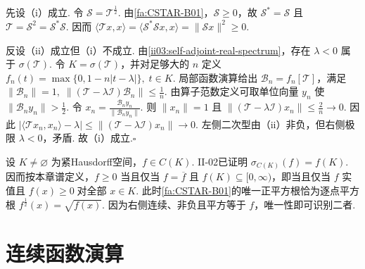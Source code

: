 \begin{FAProof}
先设（i）成立. 令 \(\displaystyle\mathcal S=\mathcal T^{\frac{1}{2}}\). 由\autoref{fa:CSTAR-B01}，\(\displaystyle\mathcal S\geqslant0\)，故 \(\displaystyle\mathcal S^*=\mathcal S\) 且 \(\displaystyle\mathcal T=\mathcal S^2=\mathcal S^*\mathcal S\). 因而
\(\displaystyle \langle\mathcal T x,x\rangle =\langle\mathcal S^*\mathcal Sx,x\rangle =\|\mathcal Sx\|^2 \geqslant0.\)

反设（ii）成立但（i）不成立. 由\autoref{ii03:self-adjoint-real-spectrum}，存在 \(\displaystyle\lambda<0\) 属于 \(\displaystyle\sigma(\mathcal T)\). 令 \(\displaystyle K=\sigma(\mathcal T)\)，并对足够大的 \(\displaystyle n\) 定义
\(\displaystyle f_n(t)=\max\{0,1-n|t-\lambda|\}, \; t\in K.\)
局部函数演算给出 \(\displaystyle\mathcal B_n=f_n[\mathcal T]\)，满足
\(\displaystyle \|\mathcal B_n\|=1, \; \|(\mathcal T-\lambda\mathcal I)\mathcal B_n\|\leqslant\frac1n.\)
由算子范数定义可取单位向量 \(\displaystyle y_n\) 使 \(\displaystyle\|\mathcal B_ny_n\|>\frac{1}{2}\). 令
\(\displaystyle x_n=\frac{\mathcal B_ny_n}{\|\mathcal B_ny_n\|}.\)
则 \(\displaystyle\|x_n\|=1\) 且
\(\displaystyle \|(\mathcal T-\lambda\mathcal I)x_n\| \leqslant\frac{2}{n} \longrightarrow0.\)
因此
\(\displaystyle \bigl|\langle\mathcal T x_n,x_n\rangle-\lambda\bigr| \leqslant\|(\mathcal T-\lambda\mathcal I)x_n\| \longrightarrow0.\)
左侧二次型由（ii）非负，但右侧极限 \(\displaystyle\lambda<0\)，矛盾. 故（i）成立.\hfill\(\square\)
\end{FAProof}

\begin{FAExample}\label{ii03:ex-cont-positivity}
设 \(\displaystyle K\neq\varnothing\) 为紧Hausdorff空间，\(\displaystyle f\in C(K)\). II-02已证明 \(\displaystyle\sigma_{C(K)}(f)=f(K)\). 因而按本章谱定义，\(\displaystyle f\geqslant0\) 当且仅当 \(\displaystyle f=\overline f\) 且 \(\displaystyle f(K)\subseteq[0,\infty)\)，即当且仅当 \(\displaystyle f\) 实值且
\(\displaystyle f(x)\geqslant0 \;\text{对全部 }x\in K.\)
此时\autoref{fa:CSTAR-B01}的唯一正平方根恰为逐点平方根
\(\displaystyle f^{\frac{1}{2}}(x)=\sqrt{f(x)}.\)
因为右侧连续、非负且平方等于 \(\displaystyle f\)，唯一性即可识别二者.
\end{FAExample}

\section{连续函数演算}\label{sec:ii03-continuous-functional-calculus}

